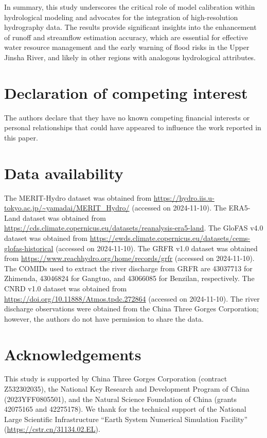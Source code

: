 \documentclass[preprint, review, authoryear, longtitle, 12pt, 3p]{elsarticle}
\begin{document}
In summary, this study underscores the critical role of model calibration within hydrological modeling and advocates for the integration of high-resolution hydrography data. The results provide significant insights into the enhancement of runoff and streamflow estimation accuracy, which are essential for effective water resource management and the early warning of flood risks in the Upper Jinsha River, and likely in other regions with analogous hydrological attributes.

\section*{Declaration of competing interest}

The authors declare that they have no known competing financial interests or personal relationships that could have appeared to influence the work reported in this paper.

\section*{Data availability}

The MERIT-Hydro dataset was obtained from \url{https://hydro.iis.u-tokyo.ac.jp/~yamadai/MERIT_Hydro/} (accessed on 2024-11-10). The ERA5-Land dataset was obtained from \url{https://cds.climate.copernicus.eu/datasets/reanalysis-era5-land}. The GloFAS v4.0 dataset was obtained from \url{https://ewds.climate.copernicus.eu/datasets/cems-glofas-historical} (accessed on 2024-11-10). The GRFR v1.0 dataset was obtained from \url{https://www.reachhydro.org/home/records/grfr} (accessed on 2024-11-10). The COMIDs used to extract the river discharge from GRFR are 43037713 for Zhimenda, 43046824 for Gangtuo, and 43066085 for Benzilan, respectively. The CNRD v1.0 dataset was obtained from \url{https://doi.org/10.11888/Atmos.tpdc.272864} (accessed on 2024-11-10). The river discharge observations were obtained from the China Three Gorges Corporation; however, the authors do not have permission to share the data.

\section*{Acknowledgements}
This study is supported by China Three Gorges Corporation (contract Z532302035), the National Key Research and Development Program of China (2023YFF0805501), and the Natural Science Foundation of China (grants 42075165 and 42275178). We thank for the technical support of the National Large Scientific Infrastructure ``Earth System Numerical Simulation Facility'' (\url{https://cstr.cn/31134.02.EL}).



\end{document}
